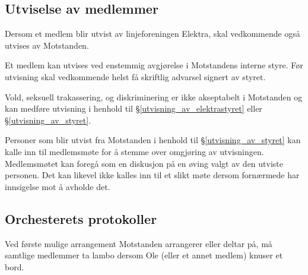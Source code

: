 \subsection{Utviselse av medlemmer}
    \begin{statute}[\label{utvisning_av_elektrastyret}]
        Dersom et medlem blir utvist av linjeforeningen Elektra, skal vedkommende også utvises av Motstanden.
    \end{statute}
    \begin{statute}[\label{utvisning_av_styret}]
        Et medlem kan utvises ved enstemmig avgjørelse i Motstandens interne styre. Før utvisning skal vedkommende helst få skriftlig advarsel signert av styret.
    \end{statute}
    \begin{statute}
        Vold, seksuell trakassering, og diskriminering er ikke akseptabelt i Motstanden og kan medføre utvisning i henhold til \S\hspace{3pt}\ref{utvisning_av_elektrastyret} eller  \S\hspace{3pt}\ref{utvisning_av_styret}.
    \end{statute}
    \begin{statute}
        Personer som blir utvist fra Motstanden i henhold til \S\hspace{3pt}\ref{utvisning_av_styret} kan kalle inn til medlemsmøte for å stemme over omgjøring av utvisningen. Medlemsmøtet kan foregå som en diskusjon på en øving valgt av den utviste personen. Det kan likevel ikke kalles inn til et slikt møte dersom fornærmede har innsigelse mot å avholde det.
    \end{statute}

\subsection{Orchesterets protokoller}
    \begin{statute}
        Ved første mulige arrangement Motstanden arrangerer eller deltar på, må samtlige medlemmer ta lambo dersom Ole (eller et annet medlem) knuser et bord.     
    \end{statute}

